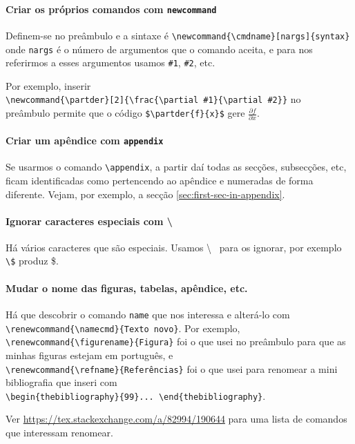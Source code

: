 \documentclass[11pt]{article}
\newcommand{\partder}[2]{\frac{\partial #1}{\partial #2}}
\renewcommand{\figurename}{Figura}
\renewcommand{\refname}{Referências}
\begin{document}
\paragraph{Criar os próprios comandos com \texttt{newcommand}}
Definem-se no preâmbulo e a sintaxe é
\verb|\newcommand{\cmdname}[nargs]{syntax}|
onde \texttt{nargs} é o número de argumentos que o comando aceita,
e para nos referirmos a esses argumentos usamos \verb|#1|, \verb|#2|, etc.

Por exemplo, inserir \\
\verb|\newcommand{\partder}[2]{\frac{\partial #1}{\partial #2}}|
no \\ preâmbulo permite que o código \verb|$\partder{f}{x}$| gere $\partder{f}{x}$.

\paragraph{Criar um apêndice com \texttt{appendix}}
Se usarmos o comando \verb|\appendix|, a partir daí todas as secções, subsecções, etc,
ficam identificadas como pertencendo ao apêndice e numeradas de forma diferente.
Vejam, por exemplo, a secção \ref{sec:first-sec-in-appendix}.

\paragraph{Ignorar caracteres especiais com \textbackslash}
Há vários caracteres que são especiais. Usamos \textbackslash~
para os ignorar, por exemplo \verb|\$| produz \$.

\paragraph{Mudar o nome das figuras, tabelas, apêndice, etc.}
Há que descobrir o comando \texttt{name} que nos interessa e alterá-lo com\\
\verb|\renewcommand{\namecmd}{Texto novo}|.
Por exemplo, \\
\verb|\renewcommand{\figurename}{Figura}| foi o que usei no preâmbulo para que
as minhas figuras estejam em português, e \\
\verb|\renewcommand{\refname}{Referências}| foi o que usei para renomear
a mini bibliografia que inseri com \\
\verb|\begin{thebibliography}{99}... \end{thebibliography}|.

Ver
\url{https://tex.stackexchange.com/a/82994/190644}
para uma lista de comandos que interessam renomear.
\end{document}

